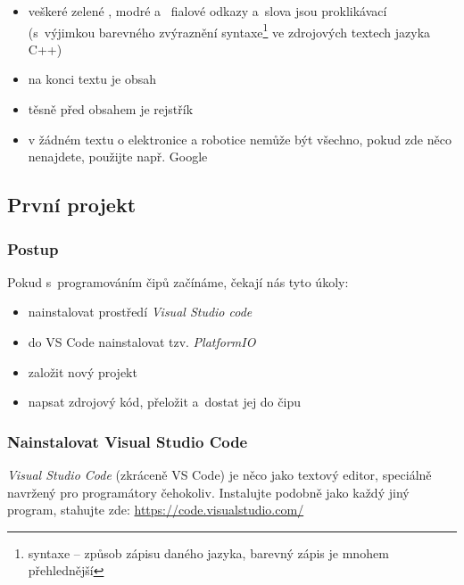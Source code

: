 \begin{itemize} %
\item  veškeré \color{green} zelené\color{black} , \color{blue} modré \color{black} a~\color{magenta} fialové \color{black} odkazy a~slova jsou proklikávací (s~výjimkou barevného zvýraznění syntaxe\footnote{syntaxe -- způsob zápisu daného jazyka, barevný zápis je mnohem přehlednější} ve zdrojových textech jazyka C++)
\item na konci textu je obsah 
\item těsně před obsahem je rejstřík
\item v žádném textu o elektronice a robotice nemůže být všechno, pokud zde něco nenajdete, použijte např. Google 
\end{itemize}

\subsection{První projekt}

\subsubsection{Postup}

Pokud s~programováním čipů začínáme, čekají nás tyto úkoly: 
\begin{itemize} %
\item  nainstalovat prostředí {\it Visual Studio code}   
\item  do VS Code nainstalovat tzv. {\it PlatformIO }

\item  založit nový projekt 

\item  napsat zdrojový kód, přeložit a~dostat jej do čipu 
\end{itemize}


\label{vsc} \subsubsection{Nainstalovat  Visual Studio Code}

{\it Visual Studio Code}  (zkráceně VS Code) je něco jako textový editor, speciálně navržený pro programátory čehokoliv. 
Instalujte podobně jako každý jiný program, stahujte zde: \url{https://code.visualstudio.com/}  

